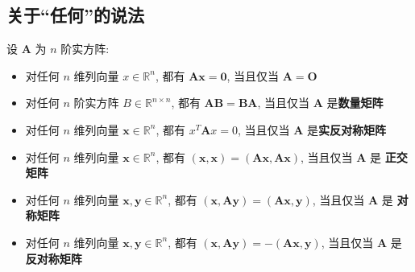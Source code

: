 \documentclass{article}
\begin{document}
		\subsection{关于“任何”的说法}
			设 $\boldsymbol A$ 为 $n$ 阶实方阵:
			\begin{itemize}
				\item 对任何 $n$ 维列向量 $x \in \mathbb{R}^{n}$, 都有 $\boldsymbol A \boldsymbol x=\mathbf 0$, 当且仅当 $\boldsymbol A=\boldsymbol O$
				\item 对任何 $n$ 阶实方阵 $B \in \mathbb{R}^{n \times n}$, 都有 $\boldsymbol A \boldsymbol B=\boldsymbol B \boldsymbol A$, 当且仅当 $\boldsymbol A$ 是\textbf{数量矩阵}
				\item 对任何 $n$ 维列向量 $\boldsymbol x \in \mathbb{R}^{n}$, 都有 $x^{T} \boldsymbol A x=0$, 当且仅当 $\boldsymbol A$ 是\textbf{实反对称矩阵}
				\item 对任何 $n$ 维列向量 $\boldsymbol x \in \mathbb{R}^{n}$, 都有 $(\boldsymbol x, \boldsymbol x)=(\boldsymbol A \boldsymbol x, \boldsymbol A \boldsymbol x)$, 当且仅当 $\boldsymbol A$ 是 \textbf{正交矩阵}
				\item 对任何 $n$ 维列向量 $\boldsymbol x, \boldsymbol y \in \mathbb{R}^{n}$, 都有 $(\boldsymbol x, \boldsymbol A \boldsymbol y)=(\boldsymbol A \boldsymbol x, \boldsymbol y)$, 当且仅当 $\boldsymbol A$ 是 \textbf{对称矩阵}
				\item 对任何 $n$ 维列向量 $\boldsymbol x, \boldsymbol y \in \mathbb{R}^{n}$, 都有 $(\boldsymbol x, \boldsymbol A \boldsymbol y)=-(\boldsymbol A \boldsymbol x, \boldsymbol y)$, 当且仅当 $\boldsymbol A$ 是\textbf{反对称矩阵}
			\end{itemize}
\end{document}
